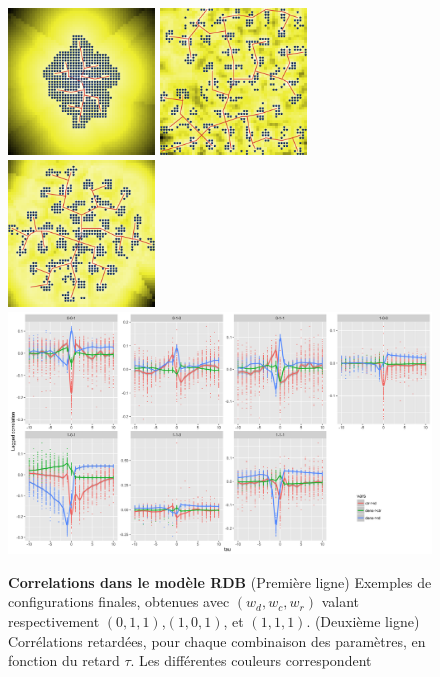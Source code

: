 \documentclass[french]{./sageo}
\begin{document}
\begin{figure}[h]
\centering
\includegraphics[width=3.9cm]{figures/ex_60_wdens0_wroad1_wcenter1_seed272727}
\includegraphics[width=3.9cm]{figures/ex_60_wdens1_wroad1_wcenter0_seed272727}
\includegraphics[width=3.9cm]{figures/ex_60_wdens1_wroad1_wcenter1_seed272727}\\\vspace{0.2cm}
\includegraphics[width=12cm]{figures/laggedcorrs_facetextreme}
\caption{\textbf{Correlations dans le modèle RDB} (Première ligne) Exemples de configurations finales, obtenues avec $(w_{d},w_{c},w_{r})$ valant respectivement $(0,1,1)$,$(1,0,1)$, et $(1,1,1)$. (Deuxième ligne) Corrélations retardées, pour chaque combinaison des paramètres, en fonction du retard $\tau$. Les différentes couleurs correspondent }
\label{fig:exrdb}
\end{figure}
\end{document}
